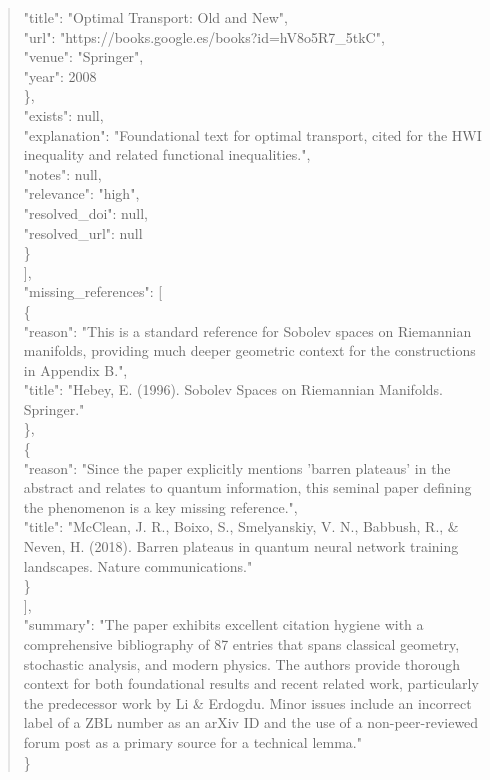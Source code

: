 \documentclass[11pt]{article}
\begin{document}
\begin{quote}
        "title": "Optimal Transport: Old and New",\\
        "url": "https://books.google.es/books?id=hV8o5R7\_5tkC",\\
        "venue": "Springer",\\
        "year": 2008\\
      \},\\
      "exists": null,\\
      "explanation": "Foundational text for optimal transport, cited for the HWI inequality and related functional inequalities.",\\
      "notes": null,\\
      "relevance": "high",\\
      "resolved\_doi": null,\\
      "resolved\_url": null\\
    \}\\
  ],\\
  "missing\_references": [\\
    \{\\
      "reason": "This is a standard reference for Sobolev spaces on Riemannian manifolds, providing much deeper geometric context for the constructions in Appendix B.",\\
      "title": "Hebey, E. (1996). Sobolev Spaces on Riemannian Manifolds. Springer."\\
    \},\\
    \{\\
      "reason": "Since the paper explicitly mentions 'barren plateaus' in the abstract and relates to quantum information, this seminal paper defining the phenomenon is a key missing reference.",\\
      "title": "McClean, J. R., Boixo, S., Smelyanskiy, V. N., Babbush, R., \& Neven, H. (2018). Barren plateaus in quantum neural network training landscapes. Nature communications."\\
    \}\\
  ],\\
  "summary": "The paper exhibits excellent citation hygiene with a comprehensive bibliography of 87 entries that spans classical geometry, stochastic analysis, and modern physics. The authors provide thorough context for both foundational results and recent related work, particularly the predecessor work by Li \& Erdogdu. Minor issues include an incorrect label of a ZBL number as an arXiv ID and the use of a non-peer-reviewed forum post as a primary source for a technical lemma."\\
\}\\
\end{quote}
\end{document}

